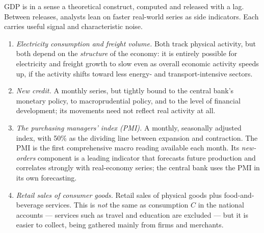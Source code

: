 GDP is in a sense a theoretical construct, computed and released with a lag. Between releases, analysts lean on faster real-world series as side indicators. Each carries useful signal and characteristic noise.

\begin{enumerate}
    \item \emph{Electricity consumption and freight volume.} Both track physical activity, but both depend on the \emph{structure} of the economy: it is entirely possible for electricity and freight growth to slow even as overall economic activity speeds up, if the activity shifts toward less energy- and transport-intensive sectors.
    \item \emph{New credit.} A monthly series, but tightly bound to the central bank's monetary policy, to macroprudential policy, and to the level of financial development; its movements need not reflect real activity at all.
    \item \emph{The purchasing managers' index (PMI).} A monthly, seasonally adjusted index, with 50\% as the dividing line between expansion and contraction. The PMI is the first comprehensive macro reading available each month. Its \emph{new-orders} component is a leading indicator that forecasts future production and correlates strongly with real-economy series; the central bank uses the PMI in its own forecasting.
    \item \emph{Retail sales of consumer goods.} Retail sales of physical goods plus food-and-beverage services. This is \emph{not} the same as consumption $C$ in the national accounts --- services such as travel and education are excluded --- but it is easier to collect, being gathered mainly from firms and merchants.
\end{enumerate}

